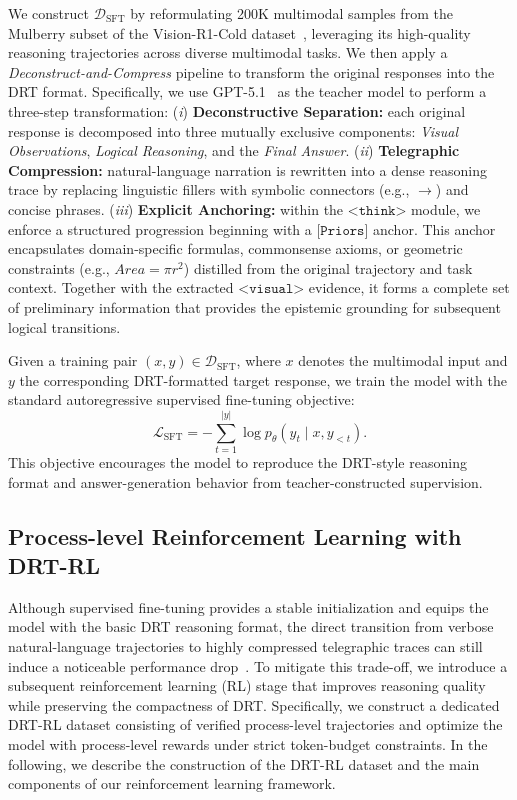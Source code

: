 We construct $\mathcal{D}_{\text{SFT}}$ by reformulating 200K multimodal samples from the Mulberry subset of the Vision-R1-Cold dataset~\cite{huang2025vision}, leveraging its high-quality reasoning trajectories across diverse multimodal tasks. We then apply a \textit{Deconstruct-and-Compress} pipeline to transform the original responses into the DRT format. Specifically, we use GPT-5.1~\cite{singh2025openai} as the teacher model to perform a three-step transformation: (\textit{i}) \textbf{Deconstructive Separation:} each original response is decomposed into three mutually exclusive components: \textit{Visual Observations}, \textit{Logical Reasoning}, and the \textit{Final Answer}. (\textit{ii}) \textbf{Telegraphic Compression:} natural-language narration is rewritten into a dense reasoning trace by replacing linguistic fillers with symbolic connectors (e.g., $\rightarrow$) and concise phrases. (\textit{iii}) \textbf{Explicit Anchoring:} within the $\texttt{<think>}$ module, we enforce a structured progression beginning with a $\texttt{[Priors]}$ anchor. This anchor encapsulates domain-specific formulas, commonsense axioms, or geometric constraints (e.g., $Area = \pi r^2$) distilled from the original trajectory and task context. Together with the extracted $\texttt{<visual>}$ evidence, it forms a complete set of preliminary information that provides the epistemic grounding for subsequent logical transitions.

Given a training pair $(x, y) \in \mathcal{D}_{\text{SFT}}$, where $x$ denotes the multimodal input and $y$ the corresponding DRT-formatted target response, we train the model with the standard autoregressive supervised fine-tuning objective:
\begin{equation}
\mathcal{L}_{\text{SFT}}
=
- \sum_{t=1}^{|y|} \log p_{\theta}(y_t \mid x, y_{<t}).
\end{equation}
This objective encourages the model to reproduce the DRT-style reasoning format and answer-generation behavior from teacher-constructed supervision.

\subsection{Process-level Reinforcement Learning with DRT-RL}\label{rl}
Although supervised fine-tuning provides a stable initialization and equips the model with the basic DRT reasoning format, the direct transition from verbose natural-language trajectories to highly compressed telegraphic traces can still induce a noticeable performance drop~\cite{nohara2026optimal,xu2025cod}. To mitigate this trade-off, we introduce a subsequent reinforcement learning (RL) stage that improves reasoning quality while preserving the compactness of DRT. Specifically, we construct a dedicated DRT-RL dataset consisting of verified process-level trajectories and optimize the model with process-level rewards under strict token-budget constraints. In the following, we describe the construction of the DRT-RL dataset and the main components of our reinforcement learning framework.


